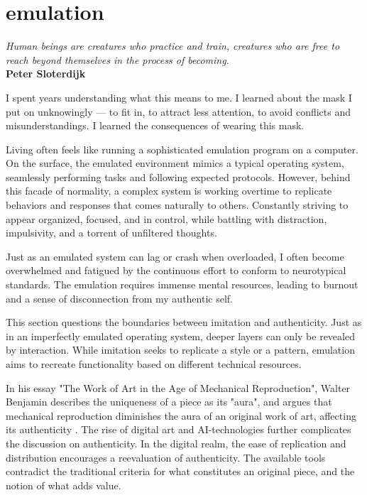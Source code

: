 \chapter*{emulation}
\begin{center}
\vspace{2cm}
\begin{flushright}
\large
\textit{ Human beings are creatures who practice and train, creatures who are free to reach beyond themselves in the process of becoming.}\\
\textbf{ Peter Sloterdijk } 
\citep{sloterdijk2014}
\end{flushright}
\vspace{2cm}
\end{center}
\normalsize

I spent years understanding what this means to me. I learned about the mask I put on unknowingly — to fit in, to attract less attention, to avoid conflicts and misunderstandings. I learned the consequences of wearing this mask. 

Living often feels like running a sophisticated emulation program on a computer. On the surface, the emulated environment mimics a typical operating system, seamlessly performing tasks and following expected protocols. However, behind this facade of normality, a complex system is working overtime to replicate behaviors and responses that comes naturally to others. Constantly striving to appear organized, focused, and in control, while battling with distraction, impulsivity, and a torrent of unfiltered thoughts.

Just as an emulated system can lag or crash when overloaded, I often become overwhelmed and fatigued by the continuous effort to conform to neurotypical standards. The emulation requires immense mental resources, leading to burnout and a sense of disconnection from my authentic self.

This section questions the boundaries between imitation and authenticity. Just as in an imperfectly emulated operating system, deeper layers can only be revealed by interaction. While imitation seeks to replicate a style or a pattern, emulation aims to recreate functionality based on different technical resources.

In his essay "The Work of Art in the Age of Mechanical Reproduction", Walter Benjamin describes the uniqueness of a piece as its "aura", and argues that mechanical reproduction diminishes the aura of an original work of art, affecting its authenticity \citep{benjamin1935}. The rise of digital art and  AI-technologies further complicates the discussion on authenticity. In the digital realm, the ease of replication and distribution encourages a reevaluation of authenticity. The available tools contradict the traditional criteria for what constitutes an original piece, and the notion of what adds value. 

